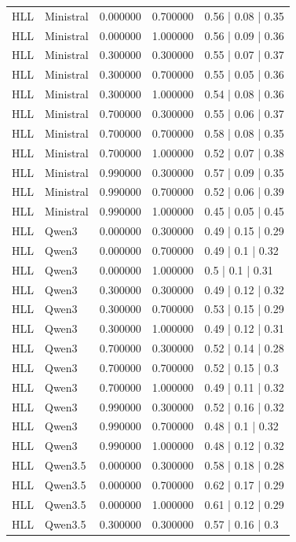 \begin{longtable}{lllll}
HLL & Ministral & 0.000000 & 0.700000 & 0.56 | 0.08 | 0.35 \\
HLL & Ministral & 0.000000 & 1.000000 & 0.56 | 0.09 | 0.36 \\
HLL & Ministral & 0.300000 & 0.300000 & 0.55 | 0.07 | 0.37 \\
HLL & Ministral & 0.300000 & 0.700000 & 0.55 | 0.05 | 0.36 \\
HLL & Ministral & 0.300000 & 1.000000 & 0.54 | 0.08 | 0.36 \\
HLL & Ministral & 0.700000 & 0.300000 & 0.55 | 0.06 | 0.37 \\
HLL & Ministral & 0.700000 & 0.700000 & 0.58 | 0.08 | 0.35 \\
HLL & Ministral & 0.700000 & 1.000000 & 0.52 | 0.07 | 0.38 \\
HLL & Ministral & 0.990000 & 0.300000 & 0.57 | 0.09 | 0.35 \\
HLL & Ministral & 0.990000 & 0.700000 & 0.52 | 0.06 | 0.39 \\
HLL & Ministral & 0.990000 & 1.000000 & 0.45 | 0.05 | 0.45 \\
HLL & Qwen3 & 0.000000 & 0.300000 & 0.49 | 0.15 | 0.29 \\
HLL & Qwen3 & 0.000000 & 0.700000 & 0.49 | 0.1 | 0.32 \\
HLL & Qwen3 & 0.000000 & 1.000000 & 0.5 | 0.1 | 0.31 \\
HLL & Qwen3 & 0.300000 & 0.300000 & 0.49 | 0.12 | 0.32 \\
HLL & Qwen3 & 0.300000 & 0.700000 & 0.53 | 0.15 | 0.29 \\
HLL & Qwen3 & 0.300000 & 1.000000 & 0.49 | 0.12 | 0.31 \\
HLL & Qwen3 & 0.700000 & 0.300000 & 0.52 | 0.14 | 0.28 \\
HLL & Qwen3 & 0.700000 & 0.700000 & 0.52 | 0.15 | 0.3 \\
HLL & Qwen3 & 0.700000 & 1.000000 & 0.49 | 0.11 | 0.32 \\
HLL & Qwen3 & 0.990000 & 0.300000 & 0.52 | 0.16 | 0.32 \\
HLL & Qwen3 & 0.990000 & 0.700000 & 0.48 | 0.1 | 0.32 \\
HLL & Qwen3 & 0.990000 & 1.000000 & 0.48 | 0.12 | 0.32 \\
HLL & Qwen3.5 & 0.000000 & 0.300000 & 0.58 | 0.18 | 0.28 \\
HLL & Qwen3.5 & 0.000000 & 0.700000 & 0.62 | 0.17 | 0.29 \\
HLL & Qwen3.5 & 0.000000 & 1.000000 & 0.61 | 0.12 | 0.29 \\
HLL & Qwen3.5 & 0.300000 & 0.300000 & 0.57 | 0.16 | 0.3 \\

\end{longtable}
